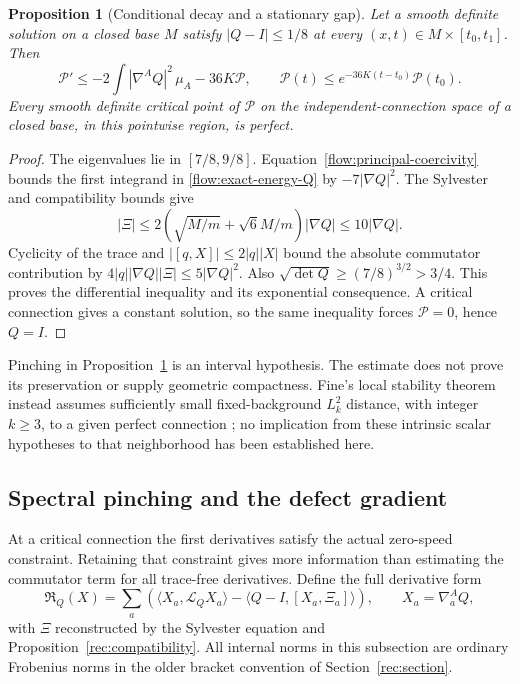 \documentclass[11pt]{article}
\numberwithin{equation}{section}
\newtheorem{proposition}[theorem]{Proposition}
\theoremstyle{definition}
\theoremstyle{remark}
\begin{document}
\begin{proposition}[Conditional decay and a stationary gap]
\label{prop:pinched-gap}
Let a smooth definite solution on a closed base $M$ satisfy
$|Q-I|\leq1/8$ at every $(x,t)\in M\times[t_0,t_1]$. Then
\begin{equation}\label{flow:pinched-decay}
 \mathcal P'\leq-2\int|\nabla^A Q|^2\,\mu_A-36K\mathcal P,
 \qquad
 \mathcal P(t)\leq e^{-36K(t-t_0)}\mathcal P(t_0).
\end{equation}
Every smooth definite critical point of $\mathcal P$ on the
independent-connection space of a closed base, in this pointwise region, is perfect.
\end{proposition}
\begin{proof}
The eigenvalues lie in $[7/8,9/8]$. Equation~\eqref{flow:principal-coercivity}
bounds the first integrand in \eqref{flow:exact-energy-Q} by
$-7|\nabla Q|^2$. The Sylvester and compatibility bounds give
\[
 |\Xi|\leq2\left(\sqrt{M/m}+\sqrt6 M/m\right)|\nabla Q|
            \leq10|\nabla Q|.
\]
Cyclicity of the trace and $|[q,X]|\leq2|q||X|$ bound the absolute
commutator contribution by
$4|q||\nabla Q||\Xi|\leq5|\nabla Q|^2$.
Also $\sqrt{\det Q}\geq(7/8)^{3/2}>3/4$.
This proves the differential inequality and its exponential consequence.
A critical connection gives a constant solution, so the same inequality
forces $\mathcal P=0$, hence $Q=I$.
\end{proof}

Pinching in Proposition~\ref{prop:pinched-gap} is an interval hypothesis.
The estimate does not prove its preservation or supply geometric
compactness. Fine's local stability theorem instead assumes sufficiently
small fixed-background $L_k^2$ distance, with integer $k\geq3$,
to a given perfect connection
\cite{Fine2011}; no implication from these intrinsic scalar hypotheses
to that neighborhood has been established here.


\subsection{Spectral pinching and the defect gradient}
\label{subsec:stationary-spectral-pinching}

At a critical connection the first derivatives satisfy the
actual zero-speed constraint. Retaining that constraint gives
more information than estimating the commutator term for all
trace-free derivatives. Define the full derivative form
\begin{equation}\label{eq:stationary-derivative-form}
 \mathfrak R_Q(X)=\sum_a\left(
   \langle X_a,\mathscr L_QX_a\rangle
       -\langle Q-I,[X_a,\Xi_a]\rangle\right),
 \qquad X_a=\nabla_a^AQ,
\end{equation}
with $\Xi$ reconstructed by the Sylvester equation and
Proposition~\ref{rec:compatibility}. All internal norms in this
subsection are ordinary Frobenius norms in the older bracket
convention of Section~\ref{rec:section}.
\end{document}
